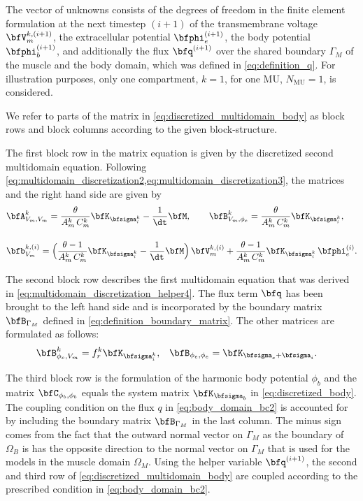 The vector of unknowns consists of the degrees of freedom in the finite element formulation at the next timestep $(i+1)$ of the transmembrane voltage $\bfV_m^{k,(i+1)}$, the extracellular potential $\bfphi_{e}^{(i+1)}$, the body potential $\bfphi_{b}^{(i+1)}$, and additionally the flux $\bfq^{(i+1)}$ over the shared boundary $\Gamma_M$ of the muscle and the body domain, which was defined in \cref{eq:definition_q}. For illustration purposes, only one compartment, $k=1$, for one MU, $N_\text{MU}=1$, is considered.

We refer to parts of the matrix in \cref{eq:discretized_multidomain_body} as block rows and block columns according to the given block-structure.

The first block row in the matrix equation is given by the discretized second multidomain equation. Following \cref{eq:multidomain_discretization2,eq:multidomain_discretization3}, the matrices and the right hand side are given by
\begin{align*}
  &\bfA^k_{V_m,V_m} = \dfrac{\theta}{A_m^k\,C_m^k}\bfK_{\bfsigma_i^k} -\dfrac{1}{\dt}\bfM, \qquad
  \bfB^k_{V_m,\phi_e} = \dfrac{\theta}{A_m^k\,C_m^k}\bfK_{\bfsigma_i^k},\\[4mm]
  &\bfb_{V_m}^{k,(i)} = \Big( \dfrac{\theta-1}{A_m^k\,C_m^k}\bfK_{\bfsigma_i^k} - \dfrac{1}{\dt}\bfM\Big)\,\bfV_m^{k,(i)} 
      + \dfrac{\theta - 1}{A_m^k\,C_m^k}\bfK_{\bfsigma_i^k}\,\bfphi_e^{(i)}.
\end{align*}
%

The second block row describes the first multidomain equation that was derived in \cref{eq:multidomain_discretization_helper4}. The flux term $\bfq$ has been brought to the left hand side and is incorporated by the boundary matrix $\bfB_{\Gamma_M}$ defined in \cref{eq:definition_boundary_matrix}. The other matrices are formulated as follows:
%
\begin{align*}
  \bfB_{\phi_e,V_m}^k &= f_r^k \bfK_{\bfsigma_i^k}, & 
  \bfB_{\phi_e,\phi_e} &= \bfK_{\bfsigma_e + \bfsigma_i}.
\end{align*}
%

The third block row is the formulation of the harmonic body potential $\phi_b$ and the matrix $\bfC_{\phi_b,\phi_b}$ equals the system matrix $\bfK_{\bfsigma_b}$ in \cref{eq:discretized_body}. The coupling condition on the flux $q$ in  \cref{eq:body_domain_bc2} is accounted for by including the boundary matrix $\bfB_{\Gamma_M}$ in the last column. The minus sign comes from the fact that the outward normal vector on $\Gamma_M$ as the boundary of $\Omega_B$ is has the opposite direction to the normal vector on $\Gamma_M$ that is used for the models in the muscle domain $\Omega_M$. Using the helper variable $\bfq^{(i+1)}$, the second and third row of \cref{eq:discretized_multidomain_body} are coupled according to the prescribed condition in \cref{eq:body_domain_bc2}.

